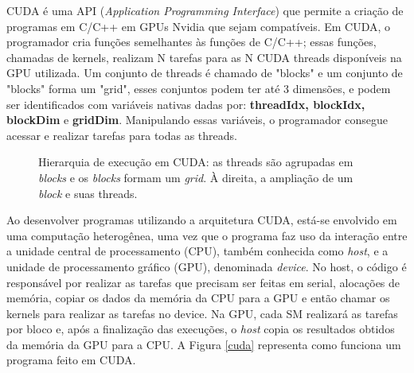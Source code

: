 \documentclass[
	12pt,				%
	openright,			%
	oneside,			%
	a4paper,			%
	english,			%
	french,				%
	spanish,			%
	brazil				%
	]{abntex2}
\begin{document}
CUDA é uma API (\textit{Application Programming Interface}) que permite a criação de programas em C/C++ em GPUs Nvidia que sejam compatíveis. Em CUDA, o programador cria funções semelhantes às funções de C/C++; essas funções, chamadas de kernels, realizam N tarefas para as N CUDA threads disponíveis na GPU utilizada. Um conjunto de threads é chamado de "blocks" e um conjunto de "blocks" forma um "grid", esses conjuntos podem ter até 3 dimensões, e podem ser identificados com variáveis nativas dadas por: \textbf{threadIdx, blockIdx,
blockDim} e \textbf{gridDim}. Manipulando essas variáveis, o programador consegue acessar e realizar tarefas para todas as threads.


\begin{figure}[H]
\centering
{}
\caption{Hierarquia de execução em CUDA: as threads são agrupadas em \textit{blocks} e os \textit{blocks} formam um \textit{grid}. À direita, a ampliação de um \textit{block} e suas threads.}
\label{fig:gridblock}
\end{figure}

Ao desenvolver programas utilizando a arquitetura CUDA, está-se envolvido em uma computação heterogênea, uma vez que o programa faz uso da interação entre a unidade central de processamento (CPU), também conhecida como \textit{host}, e a unidade de processamento gráfico (GPU), denominada \textit{device}. No host, o código é responsável por realizar as tarefas que precisam ser feitas em serial, alocações de memória, copiar os dados da memória da CPU para a GPU e então chamar os kernels para realizar as tarefas no device. Na GPU, cada SM realizará as tarefas por bloco e, após a finalização das execuções, o \textit{host} copia os resultados obtidos da memória da GPU para a CPU. A Figura \ref{cuda} representa como funciona um programa feito em CUDA.
\end{document}
